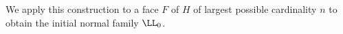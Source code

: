 We apply this construction to a face $F$ of $H$ of largest possible
cardinality $n$ to obtain the initial normal family $\LL_0$.











